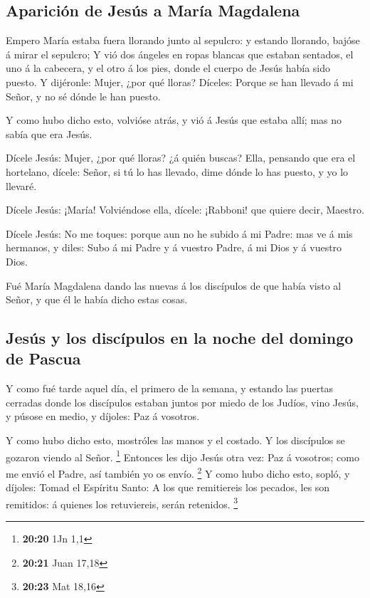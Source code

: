 \hypertarget{apariciuxf3n-de-jesuxfas-a-maruxeda-magdalena}{%
\subsection{Aparición de Jesús a María
Magdalena}\label{apariciuxf3n-de-jesuxfas-a-maruxeda-magdalena}}

 Empero María estaba fuera llorando junto al sepulcro: y
estando llorando, bajóse á mirar el sepulcro;  Y vió dos
ángeles en ropas blancas que estaban sentados, el uno á la cabecera, y
el otro á los pies, donde el cuerpo de Jesús había sido puesto.
 Y dijéronle: Mujer, ¿por qué lloras? Díceles: Porque se
han llevado á mi Señor, y no sé dónde le han puesto.

 Y como hubo dicho esto, volvióse atrás, y vió á Jesús que
estaba allí; mas no sabía que era Jesús.

 Dícele Jesús: Mujer, ¿por qué lloras? ¿á quién buscas?
Ella, pensando que era el hortelano, dícele: Señor, si tú lo has
llevado, dime dónde lo has puesto, y yo lo llevaré.

 Dícele Jesús: ¡María! Volviéndose ella, dícele: ¡Rabboni!
que quiere decir, Maestro.

 Dícele Jesús: No me toques: porque aun no he subido á mi
Padre: mas ve á mis hermanos, y diles: Subo á mi Padre y á vuestro
Padre, á mi Dios y á vuestro Dios.

 Fué María Magdalena dando las nuevas á los discípulos de
que había visto al Señor, y que él le había dicho estas cosas.

\hypertarget{jesuxfas-y-los-discuxedpulos-en-la-noche-del-domingo-de-pascua}{%
\subsection{Jesús y los discípulos en la noche del domingo de
Pascua}\label{jesuxfas-y-los-discuxedpulos-en-la-noche-del-domingo-de-pascua}}

 Y como fué tarde aquel día, el primero de la semana, y
estando las puertas cerradas donde los discípulos estaban juntos por
miedo de los Judíos, vino Jesús, y púsose en medio, y díjoles: Paz á
vosotros.

 Y como hubo dicho esto, mostróles las manos y el costado.
Y los discípulos se gozaron viendo al Señor. \footnote{\textbf{20:20}
  1Jn 1,1}  Entonces les dijo Jesús otra vez: Paz á
vosotros; como me envió el Padre, así también yo os envío. \footnote{\textbf{20:21}
  Juan 17,18}  Y como hubo dicho esto, sopló, y díjoles:
Tomad el Espíritu Santo:  A los que remitiereis los
pecados, les son remitidos: á quienes los retuviereis, serán retenidos.
\footnote{\textbf{20:23} Mat 18,16}

